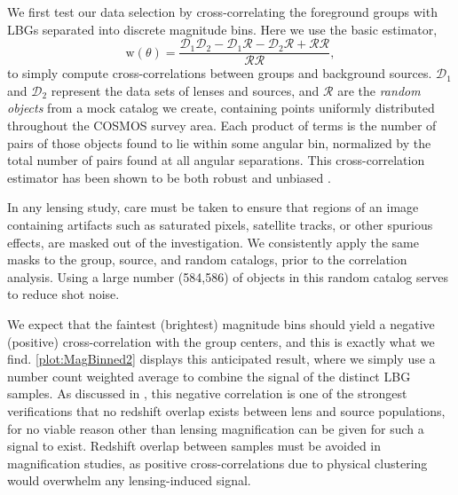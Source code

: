 We first test our data selection by cross-correlating the foreground groups with \ac{LBG}s separated into discrete magnitude bins. Here we use the basic \citet{LandySzalay93} estimator, 
\begin{equation}
\mathrm{w}(\theta)=\frac{\mathscr{D}_1 \mathscr{D}_2 - \mathscr{D}_1 \mathscr{R} - \mathscr{D}_2 \mathscr{R} + \mathscr{R}\mathscr{R}}{\mathscr{R}\mathscr{R}},
\end{equation}
to simply compute cross-correlations between groups and background sources. $\mathscr{D}_1$ and $\mathscr{D}_2$ represent the data sets of lenses and sources, and $\mathscr{R}$ are the {\it random objects} from a mock catalog we create, containing points uniformly distributed throughout the \ac{COSMOS} survey area. Each product of terms is the number of pairs of those objects found to lie within some angular bin, normalized by the total number of pairs found at all angular separations.  This cross-correlation estimator has been shown to be both robust and unbiased \citep{Kerscher00}.  

In any lensing study, care must be taken to ensure that regions of an image containing artifacts such as saturated pixels, satellite tracks, or other spurious effects, are masked out of the investigation.  We consistently apply the same masks to the group, source, and random catalogs, prior to the correlation analysis. Using a large number (584,586) of objects in this random catalog serves to reduce shot noise.  

We expect that the faintest (brightest) magnitude bins should yield a negative (positive) cross-correlation with the group centers, and this is exactly what we find. \autoref{plot:MagBinned2} displays this anticipated result, where we simply use a number count weighted average to combine the signal of the distinct \ac{LBG} samples.  As discussed in \citet{Hildebrandt09b}, this negative correlation is one of the strongest verifications that no redshift overlap exists between lens and source populations, for no viable reason other than lensing magnification can be given for such a signal to exist.  Redshift overlap between samples must be avoided in magnification studies, as positive cross-correlations due to physical clustering would overwhelm any lensing-induced signal.

